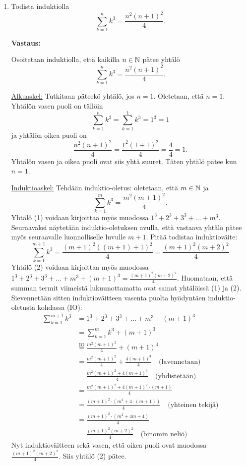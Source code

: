 \documentclass[a4paper,12pt]{article}
\begin{document}
\begin{enumerate}
\item Todista induktiolla
\[
\sum_{k=1}^n k^3 =\frac{n^2(n+1)^2}{4}.
\]  

\textbf{Vastaus:}

Osoitetaan induktiolla, että kaikilla $n\in \mathbb{N}$ pätee yhtälö
\begin{equation*}
    \sum_{k=1}^n k^3 =\frac{n^2(n+1)^2}{4}.
\end{equation*}

\underline{Alkuaskel:} Tutkitaan päteekö yhtälö, jos $n = 1$. Oletetaan, että $n=1$. Yhtälön vasen puoli on tällöin
\begin{equation*}
    \sum_{k=1}^n k^3 = \sum_{k=1}^1 k^3 = 1^3=1
\end{equation*}
ja yhtälön oikea puoli on
\begin{equation*}
    \frac{n^2(n+1)^2}{4}=\frac{1^2(1+1)^2}{4}=\frac{4}{4}=1.
\end{equation*}
Yhtälön vasen ja oikea puoli ovat siis yhtä suuret. Täten yhtälö pätee kun $n=1$.

\underline{Induktioaskel:} Tehdään induktio-oletus: oletetaan, että $m\in\mathbb{N}$ ja
\begin{equation*}
    \sum_{k=1}^m k^3 =\frac{m^2(m+1)^2}{4}. \tag{1}
\end{equation*}
Yhtälö (1) voidaan kirjoittaa myös muodossa $1^3+2^3+3^3+\dots +m^3$. Seuraavaksi näytetään induktio-oletuksen avulla, että vastaava yhtälö pätee myös seuraavalle luonnolliselle luvulle $m+1$. Pitää todistaa induktioväite:
\begin{equation*}
    \sum_{k=1}^{m+1} k^3 =\frac{(m+1)^2((m+1)+1)^2}{4} = \frac{(m+1)^2(m+2)^2}{4} \tag{2}
\end{equation*}
Yhtälö (2) voidaan kirjoittaa myös muodossa $1^3+2^3+3^3+\dots +m^3+(m+1)^3=\frac{(m+1)^2(m+2)^2}{4}$. Huomataan, että summan termit viimeistä lukuunottamatta ovat samat yhtälöissä (1) ja (2). Sievennetään sitten induktioväitteen vasenta puolta hyödyntäen induktio-oletusta kohdassa (IO):
\begin{align*}
    \sum_{k=1}^{m+1} k^3&=1^3+2^3+3^3+\dots +m^3+(m+1)^3 \\
    & = \sum_{k=1}^m k^3+(m+1)^3 \\
    & \stackrel{\text{IO}}{=} \frac{m^2(m+1)^2}{4}+(m+1)^3 \\
    & = \frac{m^2(m+1)^2}{4}+\frac{4(m+1)^3}{4} \quad\text{(lavennetaan)} \\
    & = \frac{m^2(m+1)^2+4(m+1)^3}{4} \quad\text{(yhdistetään)} \\
    & = \frac{m^2(m+1)^2+4(m+1)^2\cdot (m+1)}{4} \\
    & = \frac{(m+1)^2\cdot (m^2+4\cdot (m+1))}{4} \quad\text{(yhteinen tekijä)} \\
    & = \frac{(m+1)^2\cdot (m^2+4m+4)}{4} \\
    & = \frac{(m+1)^2(m+2)^2}{4} \quad\text{(binomin neliö)}
\end{align*}
Nyt induktioväitteen sekä vasen, että oikea puoli ovat muodossa $\frac{(m+1)^2(m+2)^2}{4}$. Siis yhtälö (2) pätee. 


\end{enumerate}
\end{document}
